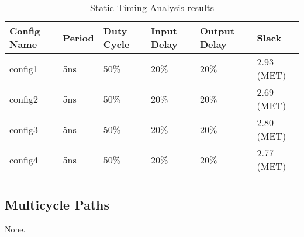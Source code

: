 \renewcommand*{\arraystretch}{1.4}
\begin{longtable}[H]{
    | p{}
    | p{}
    | p{}
    | p{}
    | p{}
    | p{} |
  }
  \hline
  \textbf{Config Name}   &
  \textbf{Period}        &
  \textbf{Duty Cycle}    &
  \textbf{Input Delay}   &
  \textbf{Output Delay}  &
  \textbf{Slack}           \\ \hline \hline

  config1 &
  5ns &
  50\% &
  20\% &
  20\% &
  2.93 (MET) \\ \hline

  config2 &
  5ns &
  50\% &
  20\% &
  20\% &
  2.69 (MET) \\ \hline

  config3 &
  5ns &
  50\% &
  20\% &
  20\% &
  2.80 (MET) \\ \hline

  config4 &
  5ns &
  50\% &
  20\% &
  20\% &
  2.77 (MET) \\ \hline

  \caption{Static Timing Analysis results}\label{table:timing}
\end{longtable}

\subsection{Multicycle Paths}
None.